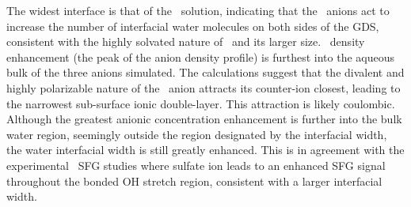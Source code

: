 The widest interface is that of the \sodsul~solution, indicating that the \sul~anions act to increase the number of interfacial water molecules on both sides of the GDS, consistent with the highly solvated nature of \sul~and its larger size. \sul~density enhancement (the peak of the anion density profile) is furthest into the aqueous bulk of the three anions simulated. The calculations suggest that the divalent and highly polarizable nature of the \sul~anion attracts its counter-ion closest, leading to the narrowest sub-surface ionic double-layer. This attraction is likely coulombic. Although the greatest anionic concentration enhancement is further into the bulk water region, seemingly outside the region designated by the interfacial width, the water interfacial width is still greatly enhanced. This is in agreement with the experimental \sodsul~SFG studies where sulfate ion leads to an enhanced SFG signal throughout the bonded OH stretch region, consistent with a larger interfacial width.\cite{McFearin2009}


